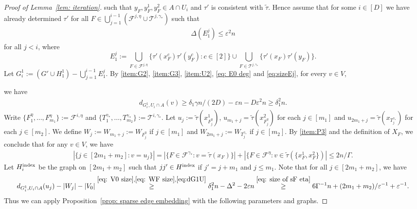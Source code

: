 \documentclass[a4paper, 11pt, reqno]{amsart}
\numberwithin{equation}{section}
\newcommand{\1}{{\rm 1\hspace*{-0.4ex}%
\rule{0.1ex}{1.52ex}\hspace*{0.2ex}}}
\newcommand{\cF}{\mathcal{F}}
\newcommand{\sF}{\mathscr{F}}
\newcommand{\sT}{\mathscr{T}}
\renewcommand{\epsilon}{\varepsilon}
\newcommand{\COMMENT}[1]{}
\begin{document}
\begin{proof}[Proof of Lemma~\ref{lem: iteration}]
such that $y_F,y_F^1,y_F^2\in A \cap U_{i}$ and $\tau'$ is consistent with $\tilde{\tau}$.
Hence assume that for some $i\in [D]$ we have already determined $\tau'$
for all $F\in \bigcup_{j=1}^{i-1}(\sF^{j,\eta}\cup \sT^{j,\gamma_*})$
such that
\begin{align}\label{eq:sizeEj}
	\Delta(E_1^{j})\leq \epsilon^2 n
\end{align}
for all $j<i$,
where
$$E_1^j:= 
\bigcup_{F\in \sF^{j,\eta}} \{ \tau'(x^c_F)\tau'(y^c_F): c\in [2]\}
\cup \bigcup_{F\in \sT^{j,\gamma_*}} \{ \tau'(x_F)\tau'(y_F)\}.
$$
Let $G^1_{i}:= (G' \cup H^1_1) - \bigcup_{j=1}^{i-1} E_1^j$. 
By \ref{item:G2}, \ref{item:G3}, \ref{item:U2}, \eqref{eq: E0 deg} and \eqref{eq:sizeEj}, for every $v\in V$,%
\COMMENT{Here, either $v\in A$ or $v\in V\setminus A$. 
In the former case, $d_{G^1_{i},U_{i}\cap A}(v) \geq d_{G',U_i\cap A}(v) - D\epsilon^2 n \geq p\gamma n/(2D)$. 
In the latter case, $d_{G^1_i,U_{i}\cap A}(v) \geq d_{H^1_1,U_i\cap A}(v) - D\epsilon^2 n \geq \delta_1\gamma n/(2D) - \epsilon n - D\epsilon^2 n \geq \delta_1^2 n$.} 
we have 
\begin{align}\label{eq:dG1U}
	d_{G^1_{i},U_{i}\cap A}(v)  \geq \delta_1\gamma n/(2D) - \epsilon n - D\epsilon^2 n \geq \delta_1^2 n.
\end{align}
Write $\{{F_1^{\eta}},\dots, F_{m_1}^{\eta}\}:=\sF^{i,\eta}$ and $\{T_{1}^{\gamma_*}, \dots, T^{\gamma_*}_{m_2}\}:=\sT^{i,\gamma_*}$. 
Let $u_j:= \tilde{\tau}(x^1_{F_j^\eta})$, $u_{m_1+j}=\tilde{\tau}(x^2_{F_j^\eta})$ for each $j\in [m_1]$ and 
$u_{2m_1+j}= \tilde{\tau}(x_{T_{j}^{\gamma_*}})$ for each $j\in [m_2]$. 
We define $W_j:=W_{m_1+j}:=W_{F_j^{\eta}}$ if $j\in [m_1]$ and 
$W_{2m_1+j}:=W_{T_{j}^{\gamma_*}}$ if $j\in [m_2]$.
By  \ref{item:P3} and the definition of $X_F$, we conclude that for any $v\in V$, we have 
\begin{align}\label{eq:settingedges}
	|\{j \in [2m_1+m_2]: v= u_j\}| =
|\{F\in \cF^{\gamma_*} : v=\tilde{\tau}(x_F)\}|+|\{F\in \cF^{\eta}: v\in \tilde{\tau}(\{x^1_F,x^2_F\})| 
 \leq 2n/\Gamma.
\end{align}
Let $H^{\rm index}_{i}$ be the graph on $[2m_1+m_2]$ such that $jj'\in H^{\rm index}$ if $j'= j+m_1$ and $j\leq m_1$. 
Note that for all $j\in [2m_1+m_2]$, we have
\begin{align*}
	d_{G^1_{i}, U_{i}\cap A}(u_j) - |W_j|-|V_0|
	\stackrel{\eqref{eq: V0 size},\eqref{eq: WF size},\eqref{eq:dG1U}}{\geq}
	 \delta_1^2 n -\Delta^2 - 2\epsilon n
	 \stackrel{\eqref{eq: size of sF eta}}{\geq}  6\Gamma^{-1} n + (2m_1+m_2)/\epsilon^{-1} + \epsilon^{-1}.
\end{align*}
Thus we can apply Proposition~\ref{prop: sparse edge embedding} with the following parameters and graphs.\newline
  

\end{proof}
\end{document}
